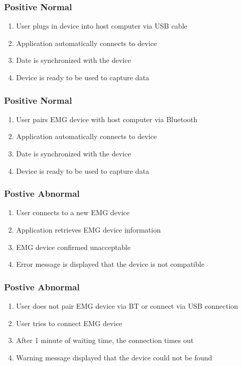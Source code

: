\documentclass[12pt,a4paper]{article}
\begin{document}
\subsubsection{Positive Normal}

\begin{enumerate}
	\item User plugs in device into host computer via USB cable
	\item Application automatically connects to device
	\item Date is synchronized with the device
	\item Device is ready to be used to capture data
\end{enumerate}

\subsubsection{Positive Normal}

\begin{enumerate}
	\item User pairs EMG device with host computer via Bluetooth
	\item Application automatically connects to device
	\item Date is synchronized with the device
	\item Device is ready to be used to capture data
\end{enumerate}

\subsubsection{Postive Abnormal}

\begin{enumerate}
	\item User connects to a new EMG device
	\item Application retrieves EMG device information
	\item EMG device confirmed unacceptable
	\item Error message is displayed that the device is not compatible 
\end{enumerate}

\subsubsection{Postive Abnormal}

\begin{enumerate}
	\item User does not pair EMG device via BT or connect via USB connection
	\item User tries to connect EMG device
	\item After 1 minute of waiting time, the connection times out
	\item Warning message displayed that the device could not be found
\end{enumerate}
\end{document}
